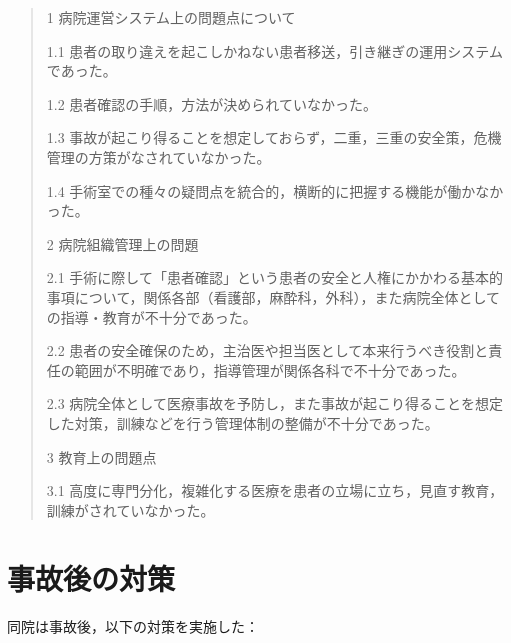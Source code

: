 \documentclass[11pt,dvipdfmx,uplatex]{jsarticle}
\begin{document}
\begin{quote}
	1 病院運営システム上の問題点について

	1.1 患者の取り違えを起こしかねない患者移送，引き継ぎの運用システムであった。

	1.2 患者確認の手順，方法が決められていなかった。

	1.3 事故が起こり得ることを想定しておらず，二重，三重の安全策，危機管理の方策がなされていなかった。

	1.4 手術室での種々の疑問点を統合的，横断的に把握する機能が働かなかった。

	2 病院組織管理上の問題

	2.1 手術に際して「患者確認」という患者の安全と人権にかかわる基本的事項について，関係各部（看護部，麻酔科，外科），また病院全体としての指導・教育が不十分であった。

	2.2 患者の安全確保のため，主治医や担当医として本来行うべき役割と責任の範囲が不明確であり，指導管理が関係各科で不十分であった。

	2.3 病院全体として医療事故を予防し，また事故が起こり得ることを想定した対策，訓練などを行う管理体制の整備が不十分であった。

	3 教育上の問題点

	3.1  高度に専門分化，複雑化する医療を患者の立場に立ち，見直す教育，訓練がされていなかった。
	
\end{quote}

\section{事故後の対策}

同院は事故後，以下の対策を実施した：
\end{document}
